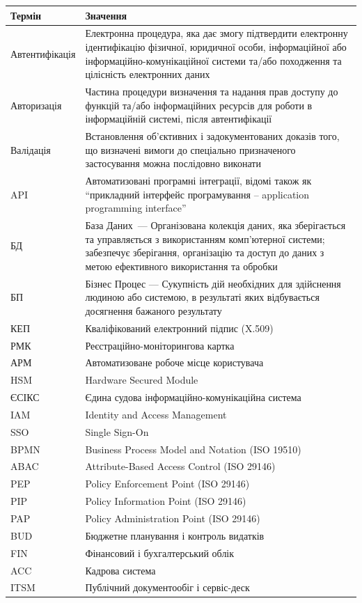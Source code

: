 \documentclass{article}
\begin{document}
\begin{longtable}{p{4cm}p{10cm}}
\toprule
\textbf{Термін} & \textbf{Значення} \\
\midrule
Автентифікація & Електронна процедура, яка дає змогу підтвердити електронну ідентифікацію фізичної, юридичної особи, інформаційної або інформаційно-комунікаційної системи та/або походження та цілісність електронних даних \\
Авторизація & Частина процедури визначення та надання прав доступу до функцій та/або інформаційних ресурсів для роботи в інформаційній системі, після автентифікації \\
Валідація & Встановлення об’єктивних і задокументованих доказів того, що визначені вимоги до спеціально призначеного застосування можна послідовно виконати \\
API & Автоматизовані програмні інтеграції, відомі також як “прикладний інтерфейс програмування – application programming interface” \\
БД & База Даних — Організована колекція даних, яка зберігається та управляється з використанням комп'ютерної системи; забезпечує зберігання, організацію та доступ до даних з метою ефективного використання та обробки \\
БП & Бізнес Процес — Сукупність дій необхідних для здійснення людиною або системою, в результаті яких відбувається досягнення бажаного результату \\
КЕП & Кваліфікований електронний підпис (X.509) \\
РМК & Реєстраційно-моніторингова картка \\
АРМ & Автоматизоване робоче місце користувача \\
HSM & Hardware Secured Module \\
ЄСІКС & Єдина судова інформаційно-комунікаційна система \\
IAM & Identity and Access Management \\
SSO & Single Sign-On \\
BPMN & Business Process Model and Notation (ISO 19510) \\
ABAC & Attribute-Based Access Control (ISO 29146) \\
PEP & Policy Enforcement Point (ISO 29146) \\
PIP & Policy Information Point (ISO 29146) \\
PAP & Policy Administration Point (ISO 29146) \\
BUD & Бюджетне планування і контроль видатків \\
FIN & Фінансовий і бухгалтерський облік \\
ACC & Кадрова система \\
ITSM & Публічний документообіг і сервіс-деск \\
\bottomrule
\end{longtable}
\end{document}
